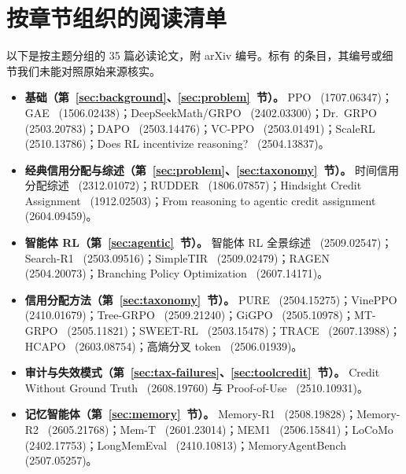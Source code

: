\section{按章节组织的阅读清单}\label{app:reading}
\normalfont\raggedright

以下是按主题分组的 35 篇必读论文，附 arXiv 编号。标有 \unverified{} 的条目，其编号或细节我们未能对照原始来源核实。

\begin{itemize}[leftmargin=*]
  \item \textbf{基础（第~\ref{sec:background}、\ref{sec:problem}~节）。} PPO~\citep{schulman2017proximal} (1707.06347)；GAE~\citep{schulman2015high} (1506.02438)；DeepSeekMath/GRPO~\citep{shao2024deepseekmath} (2402.03300)；Dr.~GRPO~\citep{liu2025understanding} (2503.20783)；DAPO~\citep{yu2025dapo} (2503.14476)；VC-PPO~\citep{yuan2025whats} (2503.01491)；ScaleRL~\citep{khatri2025art} (2510.13786)；Does RL incentivize reasoning?~\citep{yue2025does} (2504.13837)。
  \item \textbf{经典信用分配与综述（第~\ref{sec:problem}、\ref{sec:taxonomy}~节）。} 时间信用分配综述~\citep{pignatelli2024survey} (2312.01072)；RUDDER~\citep{arjonamedina2019rudder} (1806.07857)；Hindsight Credit Assignment~\citep{harutyunyan2019hindsight} (1912.02503)；From reasoning to agentic credit assignment~\citep{zhang2026from} (2604.09459)。
  \item \textbf{智能体 RL（第~\ref{sec:agentic}~节）。} 智能体 RL 全景综述~\citep{zhang2025landscape} (2509.02547)；Search-R1~\citep{jin2025search} (2503.09516)；SimpleTIR~\citep{xue2025simpletir} (2509.02479)；RAGEN~\citep{wang2025ragen} (2504.20073)；Branching Policy Optimization~\citep{bpo2026branching} (2607.14171)。
  \item \textbf{信用分配方法（第~\ref{sec:taxonomy}~节）。} PURE~\citep{cheng2025stop} (2504.15275)；VinePPO~\citep{kazemnejad2024vineppo} (2410.01679)；Tree-GRPO~\citep{ji2025tree} (2509.21240)；GiGPO~\citep{feng2025group} (2505.10978)；MT-GRPO~\citep{wei2025reinforcing} (2505.11821)；SWEET-RL~\citep{zhou2025sweet} (2503.15478)；TRACE~\citep{trace2026turn} (2607.13988)；HCAPO~\citep{tan2026hindsight} (2603.08754)；高熵分叉 token~\citep{wang2025beyond} (2506.01939)。
  \item \textbf{审计与失效模式（第~\ref{sec:tax-failures}、\ref{sec:toolcredit}~节）。} Credit Without Ground Truth~\citep{zhang2026credit} (2608.19760) 与 Proof-of-Use~\citep{proofofuse2025proof} (2510.10931)。
  \item \textbf{记忆智能体（第~\ref{sec:memory}~节）。} Memory-R1~\citep{yan2025memory} (2508.19828)；Memory-R2~\citep{yan2026memory} (2605.21768)；Mem-T~\citep{memt2026mem} (2601.23014)；MEM1~\citep{zhou2025mem1} (2506.15841)\unverified；LoCoMo~\citep{maharana2024evaluating} (2402.17753)；LongMemEval~\citep{wu2024longmemeval} (2410.10813)；MemoryAgentBench~\citep{hu2025evaluating} (2507.05257)。
\end{itemize}

